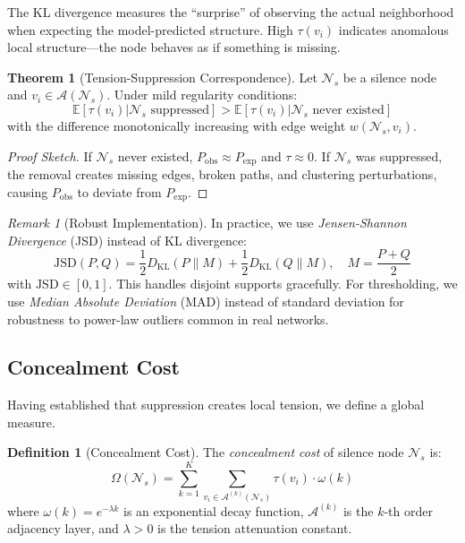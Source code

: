 \documentclass[11pt,a4paper]{article}
\theoremstyle{definition}
\newtheorem{definition}{Definition}[section]
\newtheorem{theorem}{Theorem}[section]
\theoremstyle{remark}
\newtheorem{remark}{Remark}[section]
\newcommand{\NS}{\mathcal{N}_s}
\newcommand{\CA}{\mathcal{A}}
\newcommand{\CO}{\Omega}
\newcommand{\Dkl}{D_{\mathrm{KL}}}
\begin{document}
The KL divergence measures the ``surprise'' of observing the actual neighborhood when expecting the model-predicted structure. High $\tau(v_i)$ indicates anomalous local structure---the node behaves as if something is missing.

\begin{theorem}[Tension-Suppression Correspondence]
\label{thm:correspondence}
Let $\NS$ be a silence node and $v_i \in \CA(\NS)$. Under mild regularity conditions:
\begin{equation}
    \mathbb{E}[\tau(v_i) | \NS \text{ suppressed}] > \mathbb{E}[\tau(v_i) | \NS \text{ never existed}]
\end{equation}
with the difference monotonically increasing with edge weight $w(\NS, v_i)$.
\end{theorem}

\begin{proof}[Proof Sketch]
If $\NS$ never existed, $P_{\text{obs}} \approx P_{\text{exp}}$ and $\tau \approx 0$. If $\NS$ was suppressed, the removal creates missing edges, broken paths, and clustering perturbations, causing $P_{\text{obs}}$ to deviate from $P_{\text{exp}}$.
\end{proof}

\begin{remark}[Robust Implementation]
\label{rem:robust}
In practice, we use \emph{Jensen-Shannon Divergence} (JSD) instead of KL divergence:
\begin{equation}
    \text{JSD}(P, Q) = \frac{1}{2}\Dkl(P \| M) + \frac{1}{2}\Dkl(Q \| M), \quad M = \frac{P+Q}{2}
\end{equation}
with $\text{JSD} \in [0, 1]$. This handles disjoint supports gracefully. For thresholding, we use \emph{Median Absolute Deviation} (MAD) instead of standard deviation for robustness to power-law outliers common in real networks.
\end{remark}

\subsection{Concealment Cost}

Having established that suppression creates local tension, we define a global measure.

\begin{definition}[Concealment Cost]
\label{def:concealment}
The \emph{concealment cost} of silence node $\NS$ is:
\begin{equation}
    \boxed{
    \CO(\NS) = \sum_{k=1}^{K} \sum_{v_i \in \CA^{(k)}(\NS)} \tau(v_i) \cdot \omega(k)
    }
\end{equation}
where $\omega(k) = e^{-\lambda k}$ is an exponential decay function, $\CA^{(k)}$ is the $k$-th order adjacency layer, and $\lambda > 0$ is the tension attenuation constant.
\end{definition}
\end{document}
